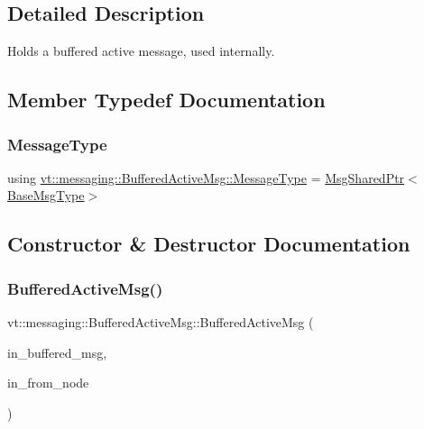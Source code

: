\subsection{Detailed Description}
Holds a buffered active message, used internally. 

\subsection{Member Typedef Documentation}
\mbox{\label{structvt_1_1messaging_1_1_buffered_active_msg_a36c6d58d477907e916a251fb358f9154}} 
\subsubsection{\texorpdfstring{Message\+Type}{MessageType}}
{\footnotesize\ttfamily using \hyperlink{structvt_1_1messaging_1_1_buffered_active_msg_a36c6d58d477907e916a251fb358f9154}{vt\+::messaging\+::\+Buffered\+Active\+Msg\+::\+Message\+Type} =  \hyperlink{structvt_1_1messaging_1_1_msg_shared_ptr}{Msg\+Shared\+Ptr}$<$\hyperlink{namespacevt_a44d0d4e144748f2b19a1cfd962f50338}{Base\+Msg\+Type}$>$}



\subsection{Constructor \& Destructor Documentation}
\mbox{\label{structvt_1_1messaging_1_1_buffered_active_msg_a91e25c090c27544b5bf5949438b60501}} 
\subsubsection{\texorpdfstring{Buffered\+Active\+Msg()}{BufferedActiveMsg()}}
{\footnotesize\ttfamily vt\+::messaging\+::\+Buffered\+Active\+Msg\+::\+Buffered\+Active\+Msg (\begin{DoxyParamCaption}\item[{\hyperlink{structvt_1_1messaging_1_1_buffered_active_msg_a36c6d58d477907e916a251fb358f9154}{Message\+Type} const \&}]{in\+\_\+buffered\+\_\+msg,  }\item[{\hyperlink{namespacevt_a866da9d0efc19c0a1ce79e9e492f47e2}{Node\+Type} const \&}]{in\+\_\+from\+\_\+node }\end{DoxyParamCaption})\hspace{0.3cm}{\ttfamily [inline]}}



